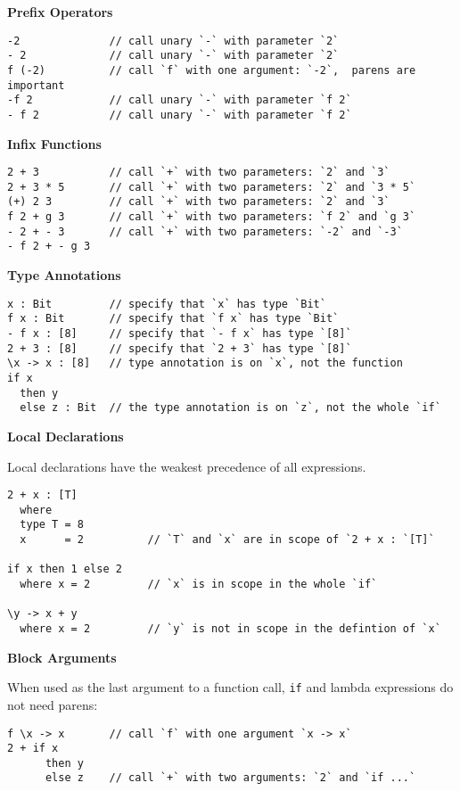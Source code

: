\textbf{Prefix Operators}

\begin{verbatim}
-2              // call unary `-` with parameter `2`
- 2             // call unary `-` with parameter `2`
f (-2)          // call `f` with one argument: `-2`,  parens are important
-f 2            // call unary `-` with parameter `f 2`
- f 2           // call unary `-` with parameter `f 2`
\end{verbatim}

\textbf{Infix Functions}

\begin{verbatim}
2 + 3           // call `+` with two parameters: `2` and `3`
2 + 3 * 5       // call `+` with two parameters: `2` and `3 * 5`
(+) 2 3         // call `+` with two parameters: `2` and `3`
f 2 + g 3       // call `+` with two parameters: `f 2` and `g 3`
- 2 + - 3       // call `+` with two parameters: `-2` and `-3`
- f 2 + - g 3
\end{verbatim}

\textbf{Type Annotations}

\begin{verbatim}
x : Bit         // specify that `x` has type `Bit`
f x : Bit       // specify that `f x` has type `Bit`
- f x : [8]     // specify that `- f x` has type `[8]`
2 + 3 : [8]     // specify that `2 + 3` has type `[8]`
\x -> x : [8]   // type annotation is on `x`, not the function
if x
  then y
  else z : Bit  // the type annotation is on `z`, not the whole `if`
\end{verbatim}

\textbf{Local Declarations}

Local declarations have the weakest precedence of all expressions.

\begin{verbatim}
2 + x : [T]
  where
  type T = 8
  x      = 2          // `T` and `x` are in scope of `2 + x : `[T]`

if x then 1 else 2
  where x = 2         // `x` is in scope in the whole `if`

\y -> x + y
  where x = 2         // `y` is not in scope in the defintion of `x`
\end{verbatim}

\textbf{Block Arguments}

When used as the last argument to a function call, \texttt{if} and
lambda expressions do not need parens:

\begin{verbatim}
f \x -> x       // call `f` with one argument `x -> x`
2 + if x
      then y
      else z    // call `+` with two arguments: `2` and `if ...`
\end{verbatim}

